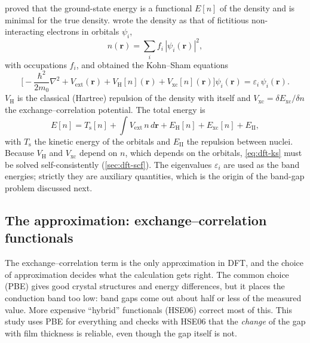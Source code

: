 \citet{Hohenberg1964} proved that the ground-state energy is a functional $E[n]$ of the density and is minimal for the
true density. \citet{Kohn1965} wrote the density as that of fictitious non-interacting electrons in orbitals $\psi_i$,
\begin{equation}
n(\mathbf{r}) = \sum_i f_i\,|\psi_i(\mathbf{r})|^2 ,
\label{eq:dft-density}
\end{equation}
with occupations $f_i$, and obtained the Kohn--Sham equations
\begin{equation}
\Big[-\frac{\hbar^2}{2m_0}\nabla^2 + V_{\mathrm{ext}}(\mathbf{r}) + V_{\mathrm{H}}[n](\mathbf{r})
+ V_{\mathrm{xc}}[n](\mathbf{r})\Big]\psi_i(\mathbf{r}) = \varepsilon_i\,\psi_i(\mathbf{r}) .
\label{eq:dft-ks}
\end{equation}
$V_{\mathrm{H}}$ is the classical (Hartree) repulsion of the density with itself and
$V_{\mathrm{xc}} = \delta E_{\mathrm{xc}}/\delta n$ the exchange--correlation potential. The total energy is
\begin{equation}
E[n] = T_{\mathrm{s}}[n] + \int V_{\mathrm{ext}}\,n\,d\mathbf{r} + E_{\mathrm{H}}[n] + E_{\mathrm{xc}}[n] + E_{\mathrm{II}} ,
\label{eq:dft-energy}
\end{equation}
with $T_{\mathrm{s}}$ the kinetic energy of the orbitals and $E_{\mathrm{II}}$ the repulsion between nuclei. Because
$V_{\mathrm{H}}$ and $V_{\mathrm{xc}}$ depend on $n$, which depends on the orbitals, \cref{eq:dft-ks} must be solved
self-consistently (\cref{sec:dft-scf}). The eigenvalues $\varepsilon_i$ are used as the band energies; strictly they
are auxiliary quantities, which is the origin of the band-gap problem discussed next.

\subsection{The approximation: exchange--correlation functionals}
\label{sec:dft-xc}

\begin{dftplain}
The exchange--correlation term is the only approximation in DFT, and the choice of approximation decides what the
calculation gets right. The common choice (PBE) gives good crystal structures and energy differences, but it places the
conduction band too low: band gaps come out about half or less of the measured value. More expensive ``hybrid''
functionals (HSE06) correct most of this. This study uses PBE for everything and checks with HSE06 that the
\emph{change} of the gap with film thickness is reliable, even though the gap itself is not.
\end{dftplain}

